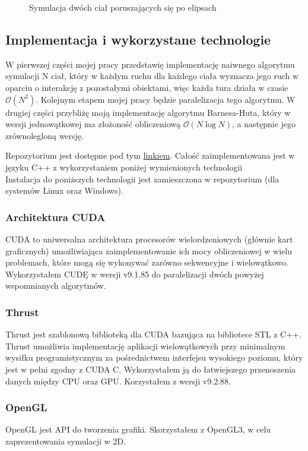 \documentclass[14pt,twoside,a4paper]{article}
\begin{document}
\begin{figure}
    \centering
    \def\svgwidth{\columnwidth}
    
    \caption{Symulacja dwóch ciał poruszających się po elipsach}
\end{figure}


\subsection{\Large Implementacja i wykorzystane technologie}
W pierwszej części mojej pracy przedstawię implementację naiwnego algorytmu symulacji N ciał, który w każdym ruchu dla każdego ciała wyznacza jego ruch w oparciu o interakcję z pozostałymi obiektami, więc każda tura działa w czasie $\mathcal{O}(N^{2})$. Kolejnym etapem mojej pracy będzie paralelizacja tego algorytmu.
W drugiej części przybliżę moją implementację algorytmu Barnesa-Huta, który w wersji jednowątkowej ma złożoność obliczeniową $\mathcal{O}(N\log{}N)$, a następnie jego zrównolegloną wersję.

Repozytorium jest dostępne pod tym \href{https://github.com/damian1996/N-Body-Simulation}{linkiem}.
Całość zaimplementowana jest w języku C++ z wykorzystaniem poniżej wymienionych technologii \\
Instalacja do poniższych technologii jest zamieszczona w repozytorium (dla systemów Linux oraz Windows).
\subsubsection{\large Architektura CUDA}
CUDA to uniwersalna architektura procesorów wielordzeniowych (głównie kart graficznych) umożliwiająca zaimplementowanie ich mocy obliczeniowej w wielu problemach, które mogą się wykonywać zarówno sekwencyjne i wielowątkowo. Wykorzystałem CUDĘ w wersji v9.1.85 do paralelizacji dwóch powyżej wspomnianych algorytmów.
\subsubsection{\large Thrust}
Thrust jest szablonową biblioteką dla CUDA bazująca na bibliotece STL z C++. Thrust umożliwia implementację aplikacji wielowątkowych przy minimalnym wysiłku programistycznym za pośrednictwem interfejsu wysokiego poziomu, który jest w pełni zgodny z CUDA C. Wykorzystałem ją do łatwiejszego przenoszenia danych między CPU oraz GPU. Korzystałem z wersji v9.2.88. 
\subsubsection{\large OpenGL}
OpenGL jest API do tworzenia grafiki. Skorzystałem z OpenGL3, w celu zaprezentowania symulacji w 2D.
\end{document}
